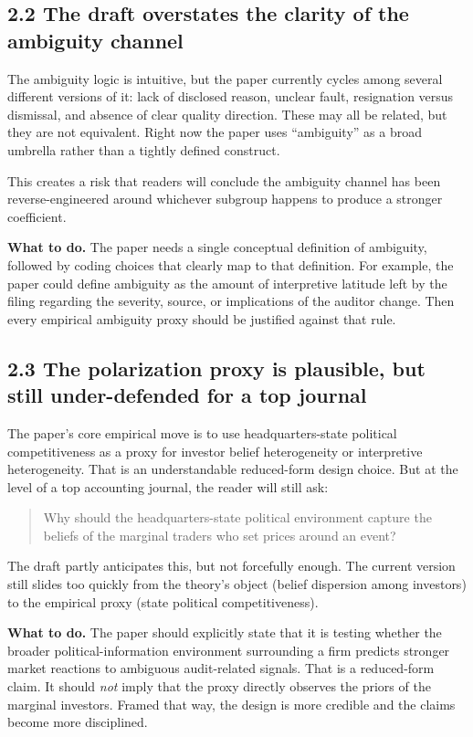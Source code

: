 \subsection*{2.2 The draft overstates the clarity of the ambiguity channel}

The ambiguity logic is intuitive, but the paper currently cycles among several different versions of it: lack of disclosed reason, unclear fault, resignation versus dismissal, and absence of clear quality direction. These may all be related, but they are not equivalent. Right now the paper uses ``ambiguity'' as a broad umbrella rather than a tightly defined construct.

This creates a risk that readers will conclude the ambiguity channel has been reverse-engineered around whichever subgroup happens to produce a stronger coefficient.

\textbf{What to do.} The paper needs a single conceptual definition of ambiguity, followed by coding choices that clearly map to that definition. For example, the paper could define ambiguity as the amount of interpretive latitude left by the filing regarding the severity, source, or implications of the auditor change. Then every empirical ambiguity proxy should be justified against that rule.

\subsection*{2.3 The polarization proxy is plausible, but still under-defended for a top journal}

The paper's core empirical move is to use headquarters-state political competitiveness as a proxy for investor belief heterogeneity or interpretive heterogeneity. That is an understandable reduced-form design choice. But at the level of a top accounting journal, the reader will still ask:

\begin{quote}
Why should the headquarters-state political environment capture the beliefs of the marginal traders who set prices around an event?
\end{quote}

The draft partly anticipates this, but not forcefully enough. The current version still slides too quickly from the theory's object (belief dispersion among investors) to the empirical proxy (state political competitiveness).

\textbf{What to do.} The paper should explicitly state that it is testing whether the broader political-information environment surrounding a firm predicts stronger market reactions to ambiguous audit-related signals. That is a reduced-form claim. It should \emph{not} imply that the proxy directly observes the priors of the marginal investors. Framed that way, the design is more credible and the claims become more disciplined.

